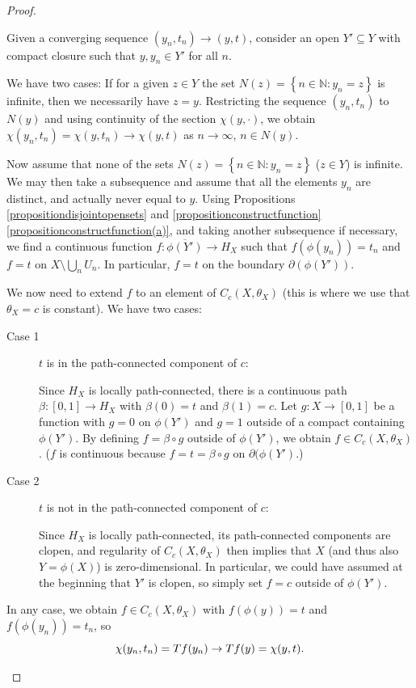 \documentclass[letter,11pt]{amsart}
\theoremstyle{plain}		\newtheorem{theorem}[generalnumbering]{Theorem}
\theoremstyle{plain}		\newtheorem{corollary}[generalnumbering]{Corollary}
\theoremstyle{definition}		\newtheorem{definition}[generalnumbering]{Definition}
\theoremstyle{definition}		\newtheorem{example}[generalnumbering]{Example}
\theoremstyle{plain}		\newtheorem{proposition}[generalnumbering]{Proposition}
\theoremstyle{plain}		\newtheorem{lemma}[generalnumbering]{Lemma}
\theoremstyle{definition}
\begin{document}
\begin{proof}
\begin{description}
		Given a converging sequence $(y_n,t_n)\to(y,t)$, consider an open $Y'\subseteq Y$ with compact closure such that $y,y_n\in Y'$ for all $n$.
		
		We have two cases: If for a given $z\in Y$ the set $N(z)=\left\{n\in\mathbb{N}:y_n=z\right\}$ is infinite, then we necessarily have $z=y$. Restricting the sequence $(y_n,t_n)$ to $N(y)$ and using continuity of the section $\chi(y,\cdot)$, we obtain $\chi(y_n,t_n)=\chi(y,t_n)\to \chi(y,t)$ as $n\to\infty$, $n\in N(y)$.
		
		Now assume that none of the sets $N(z)=\left\{n\in\mathbb{N}: y_n=z\right\}$ ($z\in Y$) is infinite. We may then take a subsequence and assume that all the elements $y_n$ are distinct, and actually never equal to $y$. Using Propositions \ref{propositiondisjointopensets} and \ref{propositionconstructfunction}\ref{propositionconstructfunction(a)}, and taking another subsequence if necessary, we find a continuous function $f\colon\overline{\phi(Y')}\to H_X$ such that $f(\phi(y_n))=t_n$ and $f=t$ on $X\setminus \bigcup_n U_n$. In particular, $f=t$ on the boundary $\partial(\phi(Y'))$.
		
		We now need to extend $f$ to an element of $C_c(X,\theta_X)$ (this is where we use that $\theta_X=c$ is constant). We have two cases:
		\begin{description}
			\item[Case 1] $t$ is in the path-connected component of $c$:
			
			Since $H_X$ is locally path-connected, there is a continuous path $\beta\colon[0,1]\to H_X$ with $\beta(0)=t$ and $\beta(1)=c$. Let $g\colon X\to[0,1]$ be a function with $g=0$ on $\phi(Y')$ and $g=1$ outside of a compact containing $\phi(Y')$. By defining $f=\beta\circ g$ outside of $\phi(Y')$, we obtain $f\in C_c(X,\theta_X)$. ($f$ is continuous because $f=t=\beta\circ g$ on $\partial(\phi(Y')$.)
			\item[Case 2] $t$ is not in the path-connected component of $c$:
			
			Since $H_X$ is locally path-connected, its path-connected components are clopen, and regularity of $C_c(X,\theta_X)$ then implies that $X$ (and thus also $Y=\phi(X)$) is zero-dimensional. In particular, we could have assumed at the beginning that $Y'$ is clopen, so simply set $f=c$ outside of $\phi(Y')$.
		\end{description}
		
		In any case, we obtain $f\in C_c(X,\theta_X)$ with $f(\phi(y))=t$ and $f(\phi(y_n))=t_n$, so
		\[\chi(y_n,t_n)=Tf(y_n)\to Tf(y)=\chi(y,t).\qedhere\]
	\end{description}
\end{proof}
\end{document}
